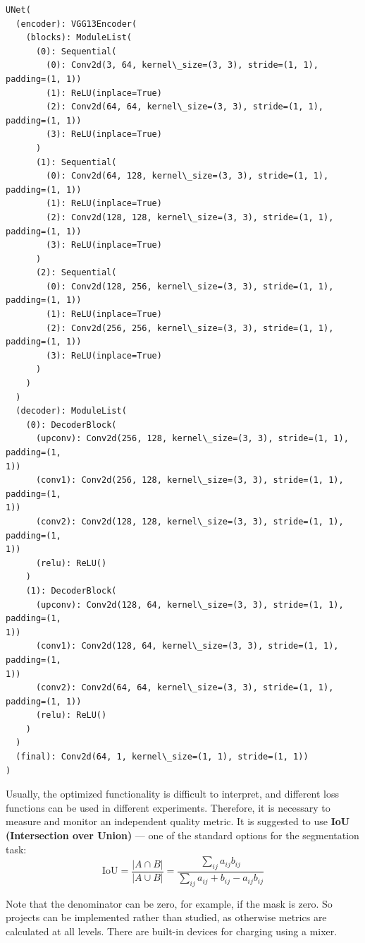\documentclass[11pt]{article}
\makeatletter
\newcommand{\boxspacing}{\kern\kvtcb@left@rule\kern\kvtcb@boxsep}
\newcommand{\prompt}[4]{
        {\ttfamily\llap{{\color{#2}[#3]:\hspace{3pt}#4}}\vspace{-\baselineskip}}
    }
\makeatother
\begin{document}
            \begin{tcolorbox}[breakable, size=fbox, boxrule=.5pt, pad at break*=1mm, opacityfill=0]
\prompt{Out}{outcolor}{17}{\boxspacing}
\begin{Verbatim}[commandchars=\\\{\}]
UNet(
  (encoder): VGG13Encoder(
    (blocks): ModuleList(
      (0): Sequential(
        (0): Conv2d(3, 64, kernel\_size=(3, 3), stride=(1, 1), padding=(1, 1))
        (1): ReLU(inplace=True)
        (2): Conv2d(64, 64, kernel\_size=(3, 3), stride=(1, 1), padding=(1, 1))
        (3): ReLU(inplace=True)
      )
      (1): Sequential(
        (0): Conv2d(64, 128, kernel\_size=(3, 3), stride=(1, 1), padding=(1, 1))
        (1): ReLU(inplace=True)
        (2): Conv2d(128, 128, kernel\_size=(3, 3), stride=(1, 1), padding=(1, 1))
        (3): ReLU(inplace=True)
      )
      (2): Sequential(
        (0): Conv2d(128, 256, kernel\_size=(3, 3), stride=(1, 1), padding=(1, 1))
        (1): ReLU(inplace=True)
        (2): Conv2d(256, 256, kernel\_size=(3, 3), stride=(1, 1), padding=(1, 1))
        (3): ReLU(inplace=True)
      )
    )
  )
  (decoder): ModuleList(
    (0): DecoderBlock(
      (upconv): Conv2d(256, 128, kernel\_size=(3, 3), stride=(1, 1), padding=(1,
1))
      (conv1): Conv2d(256, 128, kernel\_size=(3, 3), stride=(1, 1), padding=(1,
1))
      (conv2): Conv2d(128, 128, kernel\_size=(3, 3), stride=(1, 1), padding=(1,
1))
      (relu): ReLU()
    )
    (1): DecoderBlock(
      (upconv): Conv2d(128, 64, kernel\_size=(3, 3), stride=(1, 1), padding=(1,
1))
      (conv1): Conv2d(128, 64, kernel\_size=(3, 3), stride=(1, 1), padding=(1,
1))
      (conv2): Conv2d(64, 64, kernel\_size=(3, 3), stride=(1, 1), padding=(1, 1))
      (relu): ReLU()
    )
  )
  (final): Conv2d(64, 1, kernel\_size=(1, 1), stride=(1, 1))
)
\end{Verbatim}
\end{tcolorbox}
        
    Usually, the optimized functionality is difficult to interpret, and
different loss functions can be used in different experiments.
Therefore, it is necessary to measure and monitor an independent quality
metric. It is suggested to use \textbf{IoU (Intersection over Union)}
--- one of the standard options for the segmentation task: \[
\text{IoU} = \frac{|A \cap B|}{|A \cup B|} = \frac{\sum\limits_{ij}a_{ij}b_{ij}}{\sum\limits_{ij}a_{ij} + b_{ij} - a_{ij}b_{ij}}
\]

Note that the denominator can be zero, for example, if the mask is zero.
So projects can be implemented rather than studied, as otherwise metrics
are calculated at all levels. There are built-in devices for charging
using a mixer.
\end{document}
